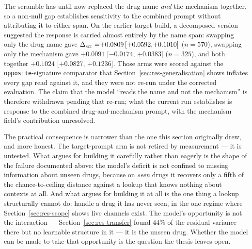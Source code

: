The scramble has until now replaced the drug name \emph{and} the mechanism together, so a non-null
gap establishes sensitivity to the combined prompt without attributing it to either span. On the
earlier target build, a decomposed version suggested the response is carried almost entirely by the
name span: swapping only the drug name gave $\gap = \ci{+0.0809}{+0.0592}{+0.1010}$ ($n = 570$),
swapping only the mechanism gave $+0.0091$ [$-0.0174$, $+0.0383$] ($n = 325$), and both together
$+0.1024$ [$+0.0827$, $+0.1236$]. Those arms were scored against the \texttt{opposite}-signature
comparator that Section~\ref{sec:res-generalisation} shows inflates every gap read against it, and
they were not re-run under the corrected evaluation. The claim that the model ``reads the name and
not the mechanism'' is therefore withdrawn pending that re-run; what the current run establishes is
response to the combined drug-and-mechanism prompt, with the mechanism field's contribution
unresolved.

The practical consequence is narrower than the one this section originally drew, and more honest.
The target-prompt arm is not retired by measurement --- it is untested. What argues for building it
carefully rather than eagerly is the shape of the failure documented above: the model's deficit is
not confined to missing information about unseen drugs, because on \emph{seen} drugs it recovers
only a fifth of the chance-to-ceiling distance against a lookup that knows nothing about contexts
at all. And what argues for building it at all is the one thing a lookup structurally cannot do:
handle a drug it has never seen, in the one regime where Section~\ref{sec:res-scope} shows live
channels exist. The model's opportunity is not the interaction --- Section~\ref{sec:res-transfer}
found $44\%$ of the residual variance there but no learnable structure in it --- it is the unseen
drug. Whether the model can be made to take that opportunity is the question the thesis leaves
open.
